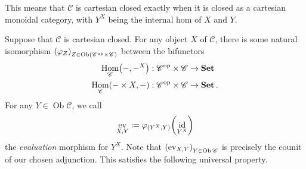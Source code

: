 \documentclass[10pt,letterpaper,cm]{nupset}
\theoremstyle{definition}
\theoremstyle{theorem}
\theoremstyle{remark}
\DeclareMathOperator{\ob}{Ob}
\DeclareMathOperator{\ev}{ev}
\newcommand{\0}{\mathbf{0}}
\newcommand{\1}{\mathbf{1}}
\newcommand{\2}{\mathbf{2}}
\DeclareMathOperator{\op}{op}
\DeclareMathOperator{\set}{\mathbf{Set}}
\renewcommand{\c}{\mathscr{C}}
\DeclareMathOperator{\Hom}{Hom}
\DeclareMathOperator{\idd}{id}
\begin{document}
This means that  $\c$ is cartesian closed exactly when it  is closed as a cartesian monoidal category, with $Y^X$ being the internal hom of $X$ and $Y$.

\medskip

Suppose that $\c$ is cartesian closed. For any object $X$ of $\c$, there is some natural isomorphism $\mleft(\varphi_{Z}\mright)_{Z\in \ob\mleft(\c^{\op} \times \c\mright)}$ between the bifunctors 
\begin{align*}
\Hom_{\c}\mleft({-}, {-}^X\mright) &: \c^{\op} \times \c  \to \set
\\ \Hom_{\c}\mleft({-}\times X, {-}\mright) &: \c^{\op} \times \c  \to \set.
\end{align*}   For any $Y \in \ob{\c}$, we call $$\ev_{X, Y} \coloneqq \varphi_{\mleft(Y^X, Y\mright)}\mleft(\idd_{Y^X}\mright)$$ the \textit{evaluation} morphism for $Y^X$. Note that $\mleft(\ev_{X, Y}\mright)_{Y \in \ob{\c}}$ is precisely the counit of our chosen adjunction. This satisfies the following universal property.
\end{document}
